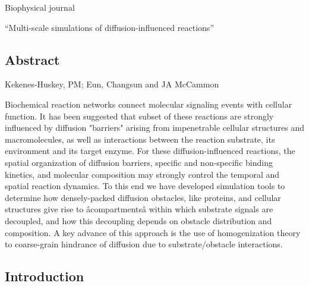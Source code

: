Biophysical journal 


 ``Multi-scale simulations of diffusion-influenced reactions''

\subsection{Abstract}

Kekenes-Huskey, PM; Eun, Changsun and JA McCammon

Biochemical reaction networks connect molecular signaling events with cellular function. 
It has been suggested that subset of these reactions are strongly influenced by diffusion "barriers" arising from impenetrable cellular structures and macromolecules, as well as interactions between the reaction substrate, its environment and its target enzyme.
For these diffusion-influenced reactions, the spatial organization of diffusion barriers, specific and non-specific binding kinetics, and molecular composition may strongly control the temporal and spatial reaction dynamics. 
To this end we have developed simulation tools to determine how densely-packed diffusion obstacles, like proteins, and cellular structures give rise to  âcompartmentsâ within which substrate signals are decoupled, and how this decoupling depends on obstacle distribution and composition.
A key advance of this approach is the use of homogenization theory to coarse-grain hindrance of diffusion due to substrate/obstacle interactions.




\subsection{Introduction}

